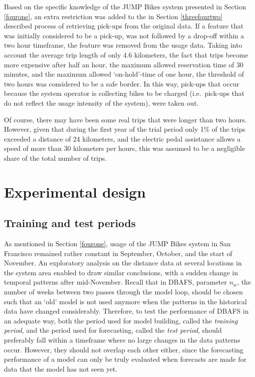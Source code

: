 \documentclass[12pt,oneside]{reedthesis}
\begin{document}
Based on the specific knowledge of the JUMP Bikes system presented in
Section \ref{fourone}, an extra restriction was added to the in Section
\ref{threefourtwo} described process of retrieving pick-ups from the
original data. If a feature that was initially considered to be a
pick-up, was not followed by a drop-off within a two hour timeframe, the
feature was removed from the usage data. Taking into account the average
trip length of only 4.6 kilometers, the fact that trips become more
expensive after half an hour, the maximum allowed reservation time of 30
minutes, and the maximum allowed `on-hold'-time of one hour, the
threshold of two hours was considered to be a safe border. In this way,
pick-ups that occur because the system operator is collecting bikes to
be charged (i.e.~pick-ups that do not reflect the usage intensity of the
system), were taken out.

Of course, there may have been some real trips that were longer than two
hours. However, given that during the first year of the trial period
only 1\% of the trips exceeded a distance of 24 kilometers, and the
electric pedal assistance allows a speed of more than 30 kilometers per
hours, this was assumed to be a negligible share of the total number of
trips.

\section{Experimental design}\label{experimental-design}

\subsection{Training and test periods}\label{training-and-test-periods}

As mentioned in Section \ref{fourone}, usage of the JUMP Bikes system in
San Francisco remained rather constant in September, October, and the
start of November. An exploratory analysis on the distance data at
several locations in the system area enabled to draw similar
conclusions, with a sudden change in temporal patterns after
mid-November. Recall that in DBAFS, parameter \(n_{w}\), the number of
weeks between two passes through the model loop, should be chosen such
that an `old' model is not used anymore when the patterns in the
historical data have changed considerably. Therefore, to test the
performance of DBAFS in an adequate way, both the period used for model
building, called the \emph{training period}, and the period used for
forecasting, called the \emph{test period}, should preferably fall
within a timeframe where no large changes in the data patterns occur.
However, they should not overlap each other either, since the
forecasting performance of a model can only be truly evaluated when
forecasts are made for data that the model has not seen yet.
\end{document}
